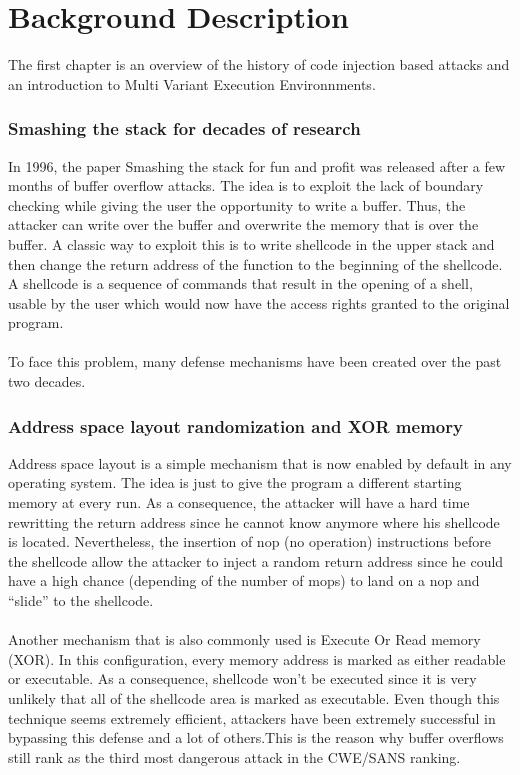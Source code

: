 \documentclass[english]{enstaPRE}
\begin{document}
\part{Background Description}
The first chapter is an overview of the history of code injection based attacks and an introduction to Multi Variant Execution Environnments.

\section{Smashing the stack for decades of research}
In 1996, the paper Smashing the stack for fun and profit was released after a few months of buffer overflow attacks.
The idea is to exploit the lack of boundary checking while giving the user the opportunity to write a buffer.
Thus, the attacker can write over the buffer and overwrite the memory that is over the buffer. 
A classic way to exploit this is to write shellcode in the upper stack and then change the return address of the function
to the beginning of the shellcode. A shellcode is a sequence of commands that result in the opening of a shell, usable by the user which
would now have the access rights granted to the original program.\\
 \\

To face this problem, many defense mechanisms have been created over the past two decades.

\section{Address space layout randomization and XOR memory}
Address space layout is a simple mechanism that is now enabled by default in any operating system. The idea is just to give the 
program a different starting memory at every run. As a consequence, the attacker will have a hard time rewritting the return address since
he cannot know anymore where his shellcode is located. 
Nevertheless, the insertion of nop (no operation) instructions before the shellcode allow the attacker to inject a random 
return address since he could have a high chance (depending of the number of mops) to land on a nop and ``slide'' to the shellcode.
\\ \\
Another mechanism that is also commonly used is Execute Or Read memory (XOR). In this configuration, every memory address is marked
as either readable or executable. As a consequence, shellcode won't be executed since it is very unlikely that all of the shellcode
area is marked as executable.
Even though this technique seems extremely efficient, attackers have been extremely successful in bypassing this defense 
and a lot of others.This is the reason why buffer overflows still rank as the third most dangerous attack in the CWE/SANS ranking.\\
 \\
\end{document}
